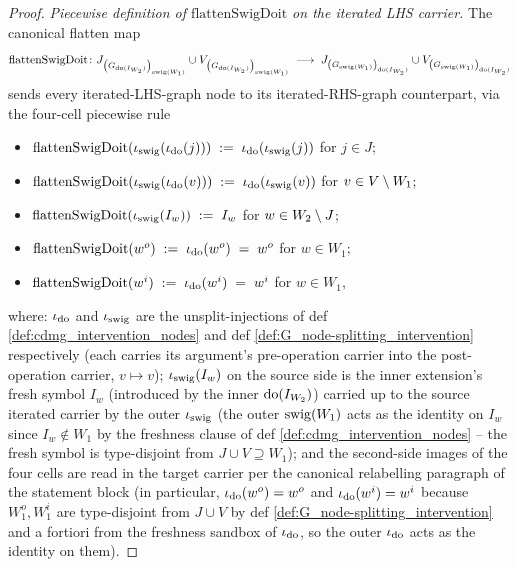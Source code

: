 \documentclass[main]{subfiles}
\providecommand{\flattenSwigDoit}{\mathrm{flattenSwigDoit}}
\begin{document}
\begin{proof}
\smallskip\noindent\emph{Piecewise definition of $\flattenSwigDoit$ on the iterated LHS carrier.}
The canonical flatten map
\[ \flattenSwigDoit \colon J_{\lp G_{\doit(I_{W_2})} \rp_{\swig(W_1)}} \cup V_{\lp G_{\doit(I_{W_2})} \rp_{\swig(W_1)}} \;\longrightarrow\; J_{\lp G_{\swig(W_1)} \rp_{\doit(I_{W_2})}} \cup V_{\lp G_{\swig(W_1)} \rp_{\doit(I_{W_2})}} \]
sends every iterated-LHS-graph node to its iterated-RHS-graph counterpart, via the four-cell piecewise rule
\begin{itemize}
    \item $\flattenSwigDoit(\iota_{\swig}(\iota_{\doit}(j))) \;:=\; \iota_{\doit}(\iota_{\swig}(j))$ for $j \in J$;
    \item $\flattenSwigDoit(\iota_{\swig}(\iota_{\doit}(v))) \;:=\; \iota_{\doit}(\iota_{\swig}(v))$ for $v \in V \setminus W_1$;
    \item $\flattenSwigDoit(\iota_{\swig}(I_w)) \;:=\; I_w$ for $w \in W_2 \setminus J$;
    \item $\flattenSwigDoit(w^o) \;:=\; \iota_{\doit}(w^o) \;=\; w^o$ for $w \in W_1$;
    \item $\flattenSwigDoit(w^i) \;:=\; \iota_{\doit}(w^i) \;=\; w^i$ for $w \in W_1$,
\end{itemize}
where: $\iota_{\operatorname{do}}$ and $\iota_{\mathrm{swig}}$ are the unsplit-injections of def \ref{def:cdmg_intervention_nodes} and def \ref{def:G_node-splitting_intervention} respectively (each carries its argument's pre-operation carrier into the post-operation carrier, $v \mapsto v$); $\iota_{\mathrm{swig}}(I_w)$ on the source side is the inner extension's fresh symbol $I_w$ (introduced by the inner $\operatorname{do}(I_{W_2})$) carried up to the source iterated carrier by the outer $\iota_{\mathrm{swig}}$ (the outer $\mathrm{swig}(W_1)$ acts as the identity on $I_w$ since $I_w \notin W_1$ by the freshness clause of def \ref{def:cdmg_intervention_nodes} -- the fresh symbol is type-disjoint from $J \cup V \supseteq W_1$); and the second-side images of the four cells are read in the target carrier per the canonical relabelling paragraph of the statement block (in particular, $\iota_{\operatorname{do}}(w^o) = w^o$ and $\iota_{\operatorname{do}}(w^i) = w^i$ because $W_1^o, W_1^i$ are type-disjoint from $J \cup V$ by def \ref{def:G_node-splitting_intervention} and a fortiori from the freshness sandbox of $\iota_{\operatorname{do}}$, so the outer $\iota_{\operatorname{do}}$ acts as the identity on them).


\end{proof}
\end{document}
